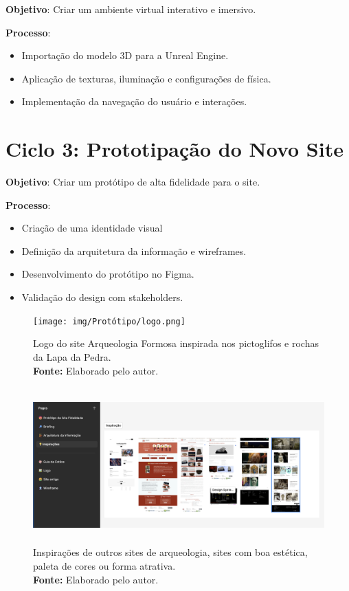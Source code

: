 \textbf{Objetivo}: Criar um ambiente virtual interativo e imersivo.

\textbf{Processo}:
\begin{itemize}
    \item Importação do modelo 3D para a Unreal Engine.
    \item Aplicação de texturas, iluminação e configurações de física.
    \item Implementação da navegação do usuário e interações.
\end{itemize}

\section{Ciclo 3: Prototipação do Novo Site}
\label{sec:ciclo3_prototipacao}

\textbf{Objetivo}: Criar um protótipo de alta fidelidade para o site.

\textbf{Processo}:
\begin{itemize}
    \item Criação de uma identidade visual
    \item Definição da arquitetura da informação e wireframes.
    \item Desenvolvimento do protótipo no Figma.
    \item Validação do design com stakeholders.
\end{itemize}

\begin{figure}[H]
    \centering
    \texttt{[image: img/Protótipo/logo.png]}
    \caption{ Logo do site Arqueologia Formosa inspirada nos pictoglifos e rochas da Lapa da Pedra. \\
        \textbf{Fonte:} Elaborado pelo autor.}
    \label{fig:logo_arqueologia_formosa}
\end{figure}

\begin{figure}[H]
    \centering
    \includegraphics[height=6cm, keepaspectratio]{img/Protótipo/inspiração.png}
    \caption{ Inspirações de outros sites de arqueologia, sites com boa estética, \\ paleta de cores ou forma atrativa. \\
        \textbf{Fonte:} Elaborado pelo autor.}
    \label{fig:inpirações}
\end{figure}

